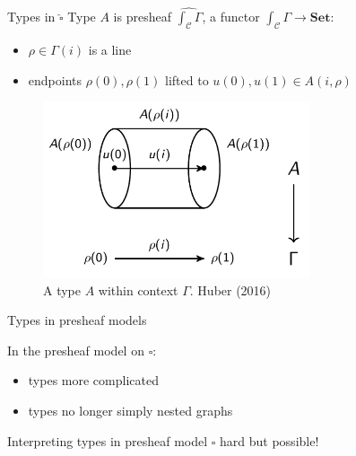 \documentclass[english, draft]{beamer}
\begin{document}
\begin{frame}{Types in $\widehat{\square}$}
    Type $A$ is presheaf $\widehat{\int_{\mathcal{C}} \Gamma}$, a functor $\int_{\mathcal{C}} \Gamma \rightarrow \mathbf{Set}$:

    \begin{itemize}
        \item $\rho \in \Gamma (i)$ is a line
        \item endpoints $\rho (0), \rho (1)$ lifted to $u(0),u(1) \in A(i,\rho)$
    \end{itemize}

 \begin{figure}
\centering
\includegraphics[width=0.7\textwidth]{figures/types}
\caption{A type $A$ within context $\Gamma$. Huber (2016)}
 \end{figure}
 
\end{frame}



\begin{frame}{Types in presheaf models}

In the presheaf model on $\square$:
\begin{itemize}
    \item types more complicated
    \item types no longer simply nested graphs
\end{itemize}



Interpreting types in presheaf model $\square$ hard but possible! 

\end{frame}
\end{document}
